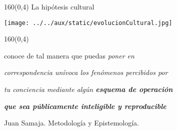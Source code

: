 \documentclass[shownotes,aspectratio=169]{beamer}
\newif\ifen
\newif\ifes
\newcommand{\en}[1]{\ifen#1\fi}
\newcommand{\es}[1]{\ifes#1\fi}
\begin{document}
\begin{frame}[plain]
\begin{textblock}{160}(0,4)
 \centering \LARGE 
 La hipótesis cultural
 \end{textblock}
\vspace{1cm}

\texttt{[image: ../../aux/static/evolucionCultural.jpg]}

\end{frame}
% 
%  
% 
% 
%  
% 
% 


\begin{frame}[plain]
\begin{textblock}{160}(0,4)
 \centering
 \LARGE \textcolor{black!85}{\en{Science as intersubjectivity}}
\end{textblock}
\vspace{0.75cm}

 
\begin{center}
conoce de tal manera que puedas \emph{poner en}

\emph{correspondencia unívoca los fenómenos percibidos por}

\emph{tu conciencia mediante algún \textbf{esquema de operación}}

\emph{\textbf{que sea públicamente inteligible y reproducible}}

\vspace{0.2cm}
{\small \hspace{5cm} Juan Samaja. Metodología y Epistemología.}
\end{center}



\end{frame}
\end{document}
